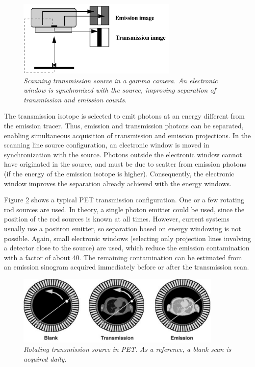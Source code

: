 \begin{figure}[tb]
\centering
\includegraphics[width=\figone]{figs/fig_specttrans.pdf}
\caption{\label{fig:specttrans} \emph{Scanning transmission source in a gamma
camera. An electronic window is synchronized with the source, improving
separation of transmission and emission counts.}}
\end{figure}

The transmission isotope is selected to emit photons at an energy
different from the emission tracer. Thus, emission and transmission
photons can be separated, enabling simultaneous acquisition of
transmission and emission projections. In the scanning line source
configuration, an electronic window is moved in synchronization
with the source. Photons outside the electronic window cannot have
originated in the source, and must be due to scatter from emission
photons (if the energy of the emission isotope is
higher). Consequently, the electronic window improves the separation
already achieved with the energy windows.

Figure \ref{fig:pettrans} shows a typical PET transmission
configuration. One or a few rotating rod sources are used. In theory,
a single photon emitter could be used, since the position of the rod
sources is known at all times. However, current systems usually use a
positron emitter, so separation based on energy windowing is not
possible. Again, small electronic windows (selecting only projection
lines involving a detector close to the source) are used, which reduce
the emission contamination with a factor of about 40. The remaining
contamination can be estimated from an emission sinogram acquired
immediately before or after the transmission scan.

\begin{figure}[tb]
\centering
\includegraphics[width=0.9\textwidth]{figs/fig_pettrans.pdf}
\caption{\label{fig:pettrans} \emph{Rotating transmission source in PET. As a
reference, a blank scan is acquired daily.}}
\end{figure}


